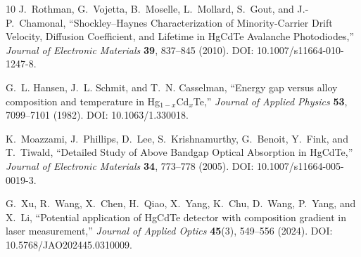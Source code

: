 \documentclass[11pt]{article}
\begin{document}
\begin{thebibliography}{10}
J.~Rothman, G.~Vojetta, B.~Moselle, L.~Mollard, S.~Gout, and J.-P.~Chamonal, ``Shockley--Haynes Characterization of Minority-Carrier Drift Velocity, Diffusion Coefficient, and Lifetime in HgCdTe Avalanche Photodiodes,'' \emph{Journal of Electronic Materials} \textbf{39}, 837--845 (2010). DOI: 10.1007/s11664-010-1247-8.

G.~L. Hansen, J.~L. Schmit, and T.~N. Casselman, ``Energy gap versus alloy composition and temperature in Hg$_{1-x}$Cd$_x$Te,'' \emph{Journal of Applied Physics} \textbf{53}, 7099--7101 (1982). DOI: 10.1063/1.330018.

K.~Moazzami, J.~Phillips, D.~Lee, S.~Krishnamurthy, G.~Benoit, Y.~Fink, and T.~Tiwald, ``Detailed Study of Above Bandgap Optical Absorption in HgCdTe,'' \emph{Journal of Electronic Materials} \textbf{34}, 773--778 (2005). DOI: 10.1007/s11664-005-0019-3.

G.~Xu, R.~Wang, X.~Chen, H.~Qiao, X.~Yang, K.~Chu, D.~Wang, P.~Yang, and X.~Li, ``Potential application of HgCdTe detector with composition gradient in laser measurement,'' \emph{Journal of Applied Optics} \textbf{45}(3), 549--556 (2024). DOI: 10.5768/JAO202445.0310009.

\end{thebibliography}
\end{document}
